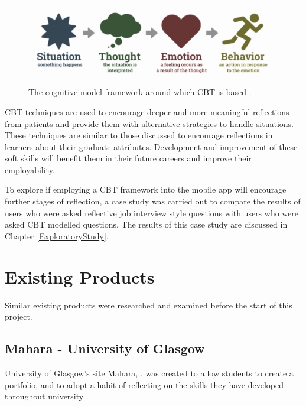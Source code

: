 \documentclass{l4proj}
\begin{document}
\begin{figure}[h!]
    \begin{centering}
    \includegraphics[scale=0.55]{images/cognitive-model.png}
    \caption{The cognitive model framework around which CBT is based \citep{therapist_aid_psychoeducation}.}
    \label{fig: CognitiveModel}
    \end{centering}
\end{figure}

CBT techniques are used to encourage deeper and more meaningful reflections from patients and provide them with alternative strategies to handle situations. These techniques are similar to those discussed to encourage reflections in learners about their graduate attributes. Development and improvement of these soft skills will benefit them in their future careers and improve their employability.

To explore if employing a CBT framework into the mobile app will encourage further stages of reflection, a case study was carried out to compare the results of users who were asked reflective job interview style questions with users who were asked CBT modelled questions. The results of this case study are discussed in Chapter \ref{ExploratoryStudy}.

\section{Existing Products}

Similar existing products were researched and examined before the start of this project.

\subsection{Mahara - University of Glasgow}

University of Glasgow's site Mahara, \citep{mahara_dashboard}, was created to allow students to create a portfolio, and to adopt a habit of reflecting on the skills they have developed throughout university \citep{glasgow_university_attributes}.
\end{document}
